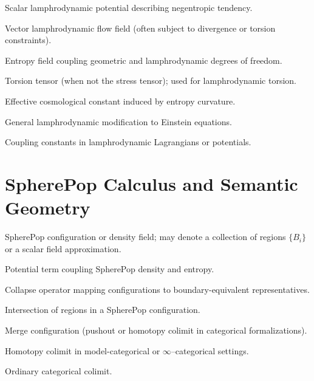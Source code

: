 \documentclass[12pt]{article}
\theoremstyle{plain}
\theoremstyle{definition}
\theoremstyle{remark}
\begin{document}
\begin{description}[leftmargin=2.5cm,style=nextline]

\item[$\Phi$]
Scalar lamphrodynamic potential describing negentropic tendency.

\item[$v$]
Vector lamphrodynamic flow field (often subject to divergence or torsion
constraints).

\item[$S$]
Entropy field coupling geometric and lamphrodynamic degrees of freedom.

\item[$\mathcal{T}$, $T^a{}_{bc}$]
Torsion tensor (when not the stress tensor); used for lamphrodynamic torsion.

\item[$\Lambda_{\rm eff}$]
Effective cosmological constant induced by entropy curvature.

\item[$\Theta_{ab}$]
General lamphrodynamic modification to Einstein equations.

\item[$\lambda_i$]
Coupling constants in lamphrodynamic Lagrangians or potentials.

\end{description}


\section{SpherePop Calculus and Semantic Geometry}

\begin{description}[leftmargin=2.5cm,style=nextline]

\item[$\sigma$]
SpherePop configuration or density field; may denote a collection of regions
$\{B_i\}$ or a scalar field approximation.

\item[$V(\sigma,S)$]
Potential term coupling SpherePop density and entropy.

\item[$\kappa$]
Collapse operator mapping configurations to boundary-equivalent
representatives.

\item[$A\cap B$]
Intersection of regions in a SpherePop configuration.

\item[$A\cup B$]
Merge configuration (pushout or homotopy colimit in categorical formalizations).

\item[$\mathrm{hocolim}$]
Homotopy colimit in model-categorical or $\infty$--categorical settings.

\item[$\mathrm{colim}$]
Ordinary categorical colimit.

\end{description}
\end{document}
